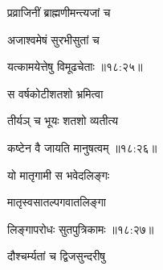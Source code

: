 {\devanagarifontbold प्रव्राजिनीं ब्राह्मणीमन्त्यजां च  \danda\dontdisplaylinenum  }%

\nemslokac

{\devanagarifontbold अजाश्वमेषं सुरभीसुतां च }%
  \dontdisplaylinenum    {}%


\nemslokad

{\devanagarifontbold यत्कामयेत्तेषु विमूढचेताः {॥१८:२५॥} \veg\dontdisplaylinenum }%

\ujvers{}

\nemslokab

{\devanagarifontbold स वर्षकोटीशतशो भ्रमित्वा  \danda\dontdisplaylinenum }%
 
\nemslokac

{\devanagarifontbold तीर्यञ् च भूयः शतशो व्यतीत्य }%
  \dontdisplaylinenum

\nemslokad

{\devanagarifontbold कष्टेन वै जायति मानुषत्वम् {॥१८:२६॥} \veg\dontdisplaylinenum }%
 
\ujvers{}

\nemslokab

{\devanagarifontbold यो मातृगामी स भवेदलिङ्गः  \danda\dontdisplaylinenum }%
 
\nemslokac

{\devanagarifontbold मातृस्वसातल्पगवातलिङ्गा }%
  \dontdisplaylinenum    {}%


\nemslokad

{\devanagarifontbold लिङ्गापरोधः सुतपुत्रिकामः {॥१८:२७॥} \veg\dontdisplaylinenum }%

\ujvers{}

\nemslokab

{\devanagarifontbold दौश्चर्म्यतां च द्विजसुन्दरीषु  \danda\dontdisplaylinenum }%
  
